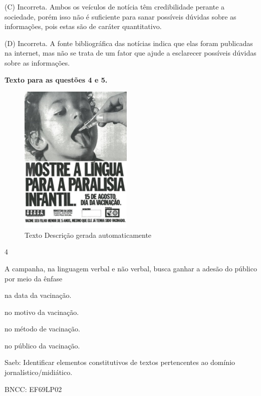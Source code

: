 (C) Incorreta. Ambos os veículos de notícia têm credibilidade perante a
sociedade, porém isso não é suficiente para sanar possíveis dúvidas
sobre as informações, pois estas são de caráter quantitativo.

(D) Incorreta. A fonte bibliográfica das notícias indica que elas foram
publicadas na internet, mas não se trata de um fator que ajude a
esclarecer possíveis dúvidas sobre as informações.

\textbf{Texto para as questões 4 e 5.}

\begin{figure}
\centering
\includegraphics[width=2.12879in,height=2.83333in]{./imgSAEB_8_POR/media/image39.jpeg}
\caption{Texto Descrição gerada automaticamente}
\end{figure}


\num{4}

A campanha, na linguagem verbal e não verbal, busca ganhar a adesão do
público por meio da ênfase

\begin{escolha}
\item na data da vacinação.

\item no motivo da vacinação.

\item no método de vacinação.

\item no público da vacinação.
\end{escolha}

Saeb: Identificar elementos constitutivos de textos pertencentes ao
domínio jornalístico/midiático.

BNCC: EF69LP02

